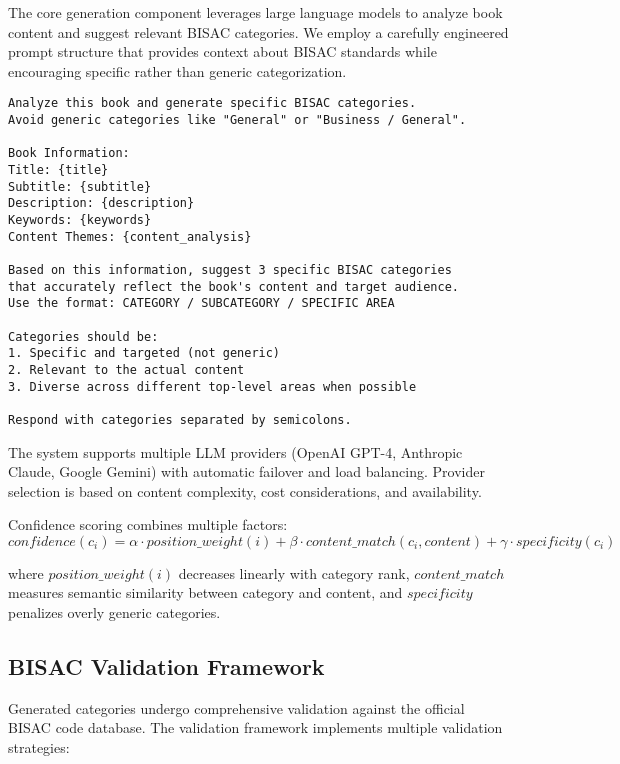 \documentclass{article}
\begin{document}
The core generation component leverages large language models to analyze book content and suggest relevant BISAC categories. We employ a carefully engineered prompt structure that provides context about BISAC standards while encouraging specific rather than generic categorization.

\begin{lstlisting}[language=text, caption=LLM Prompt Template]
Analyze this book and generate specific BISAC categories.
Avoid generic categories like "General" or "Business / General".

Book Information:
Title: {title}
Subtitle: {subtitle}
Description: {description}
Keywords: {keywords}
Content Themes: {content_analysis}

Based on this information, suggest 3 specific BISAC categories
that accurately reflect the book's content and target audience.
Use the format: CATEGORY / SUBCATEGORY / SPECIFIC AREA

Categories should be:
1. Specific and targeted (not generic)
2. Relevant to the actual content
3. Diverse across different top-level areas when possible

Respond with categories separated by semicolons.
\end{lstlisting}

The system supports multiple LLM providers (OpenAI GPT-4, Anthropic Claude, Google Gemini) with automatic failover and load balancing. Provider selection is based on content complexity, cost considerations, and availability.

Confidence scoring combines multiple factors:
\begin{equation}
confidence(c_i) = \alpha \cdot position\_weight(i) + \beta \cdot content\_match(c_i, content) + \gamma \cdot specificity(c_i)
\end{equation}

where $position\_weight(i)$ decreases linearly with category rank, $content\_match$ measures semantic similarity between category and content, and $specificity$ penalizes overly generic categories.

\subsection{BISAC Validation Framework}

Generated categories undergo comprehensive validation against the official BISAC code database. The validation framework implements multiple validation strategies:
\end{document}
